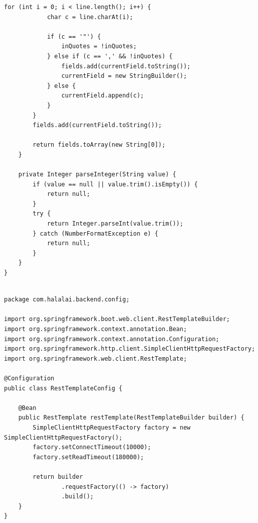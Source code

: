 \begin{lstlisting}[basicstyle=\tiny\ttfamily,breaklines=true]
        for (int i = 0; i < line.length(); i++) {
            char c = line.charAt(i);
            
            if (c == '"') {
                inQuotes = !inQuotes;
            } else if (c == ',' && !inQuotes) {
                fields.add(currentField.toString());
                currentField = new StringBuilder();
            } else {
                currentField.append(c);
            }
        }
        fields.add(currentField.toString());

        return fields.toArray(new String[0]);
    }

    private Integer parseInteger(String value) {
        if (value == null || value.trim().isEmpty()) {
            return null;
        }
        try {
            return Integer.parseInt(value.trim());
        } catch (NumberFormatException e) {
            return null;
        }
    }
}
\end{lstlisting}

\begin{lstlisting}[basicstyle=\tiny\ttfamily,breaklines=true]

package com.halalai.backend.config;

import org.springframework.boot.web.client.RestTemplateBuilder;
import org.springframework.context.annotation.Bean;
import org.springframework.context.annotation.Configuration;
import org.springframework.http.client.SimpleClientHttpRequestFactory;
import org.springframework.web.client.RestTemplate;

@Configuration
public class RestTemplateConfig {

    @Bean
    public RestTemplate restTemplate(RestTemplateBuilder builder) {
        SimpleClientHttpRequestFactory factory = new SimpleClientHttpRequestFactory();
        factory.setConnectTimeout(10000);
        factory.setReadTimeout(180000);
        
        return builder
                .requestFactory(() -> factory)
                .build();
    }
}
\end{lstlisting}

